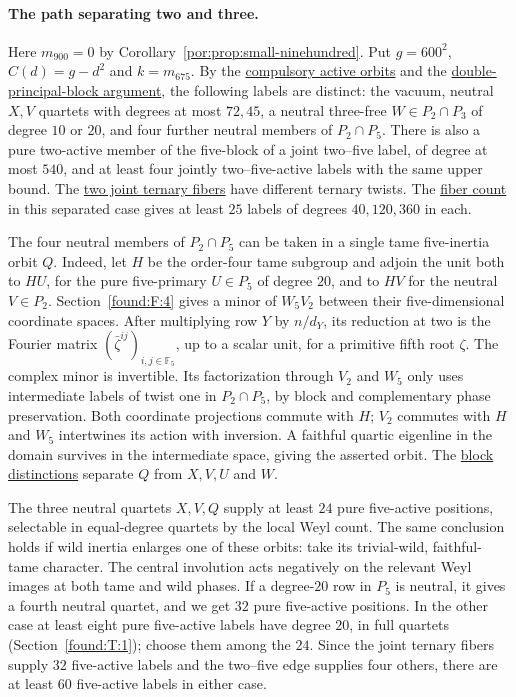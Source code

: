 \documentclass[11pt,a4paper]{article}
\numberwithin{equation}{section}
\theoremstyle{remark}
\begin{document}
\paragraph{The path separating two and three.}\label{por:count-no-six}
Here $m_{900}=0$ by Corollary~\ref{por:prop:small-ninehundred}. Put $g=600^2$, $C(d)=g-d^2$ and $k=m_{675}$. By the \hyperref[found:T:key:cor:core-lower-rank]{compulsory active orbits} and the \hyperref[por:four-neutral]{double-principal-block argument}, the following labels are distinct: the vacuum, neutral $X,V$ quartets with degrees at most $72,45$, a neutral three-free $W\in P_2\cap P_3$ of degree $10$ or $20$, and four further neutral members of $P_2\cap P_5$. There is also a pure two-active member of the five-block of a joint two--five label, of degree at most $540$, and at least four jointly two--five-active labels with the same upper bound. The \hyperref[por:two-ternary-fibers]{two joint ternary fibers} have different ternary twists. The \hyperref[por:24-joint]{fiber count} in this separated case gives at least $25$ labels of degrees $40,120,360$ in each.

The four neutral members of $P_2\cap P_5$ can be taken in a single tame five-inertia orbit $Q$. Indeed, let $H$ be the order-four tame subgroup and adjoin the unit both to $HU$, for the pure five-primary $U\in P_5$ of degree $20$, and to $HV$ for the neutral $V\in P_2$. Section~\ref{found:F:4} gives a minor of $W_5V_2$ between their five-dimensional coordinate spaces. After multiplying row $Y$ by $n/d_Y$, its reduction at two is the Fourier matrix $(\bar\zeta^{ij})_{i,j\in\mathbb F_5}$, up to a scalar unit, for a primitive fifth root $\zeta$. The complex minor is invertible. Its factorization through $V_2$ and $W_5$ only uses intermediate labels of twist one in $P_2\cap P_5$, by block and complementary phase preservation. Both coordinate projections commute with $H$; $V_2$ commutes with $H$ and $W_5$ intertwines its action with inversion. A faithful quartic eigenline in the domain survives in the intermediate space, giving the asserted orbit. The \hyperref[por:four-neutral]{block distinctions} separate $Q$ from $X,V,U$ and $W$.

The three neutral quartets $X,V,Q$ supply at least $24$ pure five-active positions, selectable in equal-degree quartets by the local Weyl count. The same conclusion holds if wild inertia enlarges one of these orbits: take its trivial-wild, faithful-tame character. The central involution acts negatively on the relevant Weyl images at both tame and wild phases. If a degree-$20$ row in $P_5$ is neutral, it gives a fourth neutral quartet, and we get $32$ pure five-active positions. In the other case at least eight pure five-active labels have degree $20$, in full quartets (Section~\ref{found:T:1}); choose them among the $24$. Since the joint ternary fibers supply $32$ five-active labels and the two--five edge supplies four others, there are at least $60$ five-active labels in either case.
\end{document}
